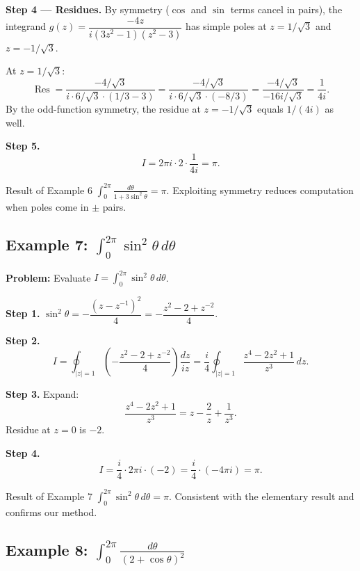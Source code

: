 \documentclass[12pt,a4paper]{article}
\begin{document}
\textbf{Step 4 --- Residues.} By symmetry ($\cos$ and $\sin$ terms cancel in pairs),
the integrand $g(z) = \dfrac{-4z}{i(3z^2-1)(z^2-3)}$ has simple poles at
$z = 1/\sqrt{3}$ and $z = -1/\sqrt{3}$.

At $z = 1/\sqrt{3}$:
\[
  \operatorname{Res} = \frac{-4/\sqrt{3}}{i \cdot 6/\sqrt{3} \cdot (1/3 - 3)}
  = \frac{-4/\sqrt{3}}{i \cdot 6/\sqrt{3} \cdot (-8/3)}
  = \frac{-4/\sqrt{3}}{-16i/\sqrt{3}} = \frac{1}{4i}.
\]
By the odd-function symmetry, the residue at $z = -1/\sqrt{3}$ equals $1/(4i)$ as well.

\textbf{Step 5.}
\[
  I = 2\pi i \cdot 2 \cdot \frac{1}{4i} = \pi.
\]

\begin{learnbox}{Result of Example 6}
$\displaystyle\int_0^{2\pi}\frac{d\theta}{1+3\sin^2\theta} = \pi$.
Exploiting symmetry reduces computation when poles come in $\pm$ pairs.
\end{learnbox}

\subsection*{Example 7: $\displaystyle\int_0^{2\pi}\sin^2\theta\,d\theta$}

\textbf{Problem:} Evaluate $I = \int_0^{2\pi}\sin^2\theta\,d\theta$.

\textbf{Step 1.} $\sin^2\theta = -\dfrac{(z-z^{-1})^2}{4} = -\dfrac{z^2-2+z^{-2}}{4}$.

\textbf{Step 2.}
\[
  I = \oint_{|z|=1}\left(-\frac{z^2-2+z^{-2}}{4}\right)\frac{dz}{iz}
    = \frac{i}{4}\oint_{|z|=1}\frac{z^4 - 2z^2 + 1}{z^3}\,dz.
\]

\textbf{Step 3.} Expand:
\[
  \frac{z^4-2z^2+1}{z^3} = z - \frac{2}{z} + \frac{1}{z^3}.
\]
Residue at $z=0$ is $-2$.

\textbf{Step 4.}
\[
  I = \frac{i}{4}\cdot 2\pi i \cdot (-2) = \frac{i}{4}\cdot(-4\pi i) = \pi.
\]

\begin{learnbox}{Result of Example 7}
$\displaystyle\int_0^{2\pi}\sin^2\theta\,d\theta = \pi$.
Consistent with the elementary result and confirms our method.
\end{learnbox}

\subsection*{Example 8: $\displaystyle\int_0^{2\pi}\frac{d\theta}{(2+\cos\theta)^2}$}
\end{document}
